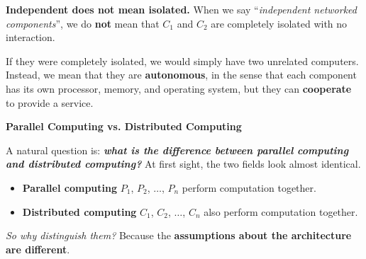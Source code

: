\highspace
\textcolor{Red2}{ \textbf{Independent does not mean isolated.}} When we say ``\emph{independent networked components}'', we do \textbf{not} mean that $C_1$ and $C_2$ are completely isolated with no interaction.

\highspace
If they were completely isolated, we would simply have two unrelated computers. Instead, we mean that they are \textbf{autonomous}, in the sense that each component has its own processor, memory, and operating system, but they can \textbf{cooperate} to provide a service.

\highspace
\begin{flushleft}
    \textcolor{Green3}{ \textbf{Parallel Computing vs. Distributed Computing}}
\end{flushleft}
A natural question is: \emph{\textbf{what is the difference between parallel computing and distributed computing?}} At first sight, the two fields look almost identical.
\begin{itemize}
    \item \textbf{Parallel computing} $P_1$, $P_2$, $\ldots$, $P_n$ perform computation together.
    \item \textbf{Distributed computing} $C_1$, $C_2$, $\ldots$, $C_n$ also perform computation together.
\end{itemize}
\emph{So why distinguish them?} Because the \textbf{assumptions about the architecture are different}.

